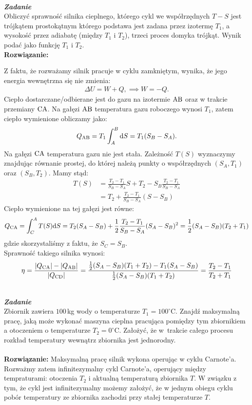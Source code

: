 \documentclass[11pt,a4paper]{article}
\newcounter{zadanie}\newcommand{\zadanie}[1][]{\addtocounter{zadanie}{1} ~\\  {\bf \emph{Zadanie \arabic{zadanie} #1 }} \\}
\begin{document}
\newpage
\zadanie
Obliczyć sprawność silnika cieplnego, którego cykl we współrzędnych $T-S$ jest trójkątem
prostokątnym którego podstawa jest zadana przez 
izotermę $T_1$, a wysokość przez adiabatę (między $T_1$ i $T_2$),  trzeci proces domyka trójkąt.
Wynik podać jako funkcję $T_1$ i $T_2$.
\\
\textbf{Rozwiązanie:}


Z faktu, że rozważamy silnik pracuje w cyklu zamkniętym, wynika, że jego energia wewnętrzna się nie zmienia:
\begin{align}
\Delta U = W + Q, \implies W = - Q.
\end{align}
Ciepło dostarczane/odbierane jest do gazu na izotermie $\rm{AB}$ oraz w trakcie przemiany $\rm{CA}$.
Na gałęzi $\rm {AB}$ temperatura gazu roboczego wynosi $T_1$, zatem ciepło wymienione obliczamy jako:
\begin{align}
Q_{\rm AB} = T_1 \int_A^B {\rm d}S = T_1 (S_B - S_A).
\end{align}
Na gałęzi $\rm CA$ temperatura gazu nie jest stała. Zależność $T(S)$ wyznaczymy znajdując równanie prostej, do której należą punkty o współrzędnych $(S_A, T_1 )$ oraz $(S_B, T_2)$. Mamy stąd:
\begin{align}
T(S) &= \frac{T_2 -T_1}{S_B-S_A} S +  T_2 - S_B \frac{T_2 -T_1}{S_B-S_A}\\
&= T_2 + \frac{T_2 -T_1}{S_B-S_A}  (S-S_B)
\end{align}
Ciepło wymienione na tej gałęzi jest równe:
\begin{align}
Q_{\rm {CA}}= \int_C^A T(S) {\rm d} S = T_2 (S_A- S_B) + \frac{1}{2}\frac{T_2- T_1}{S_B-S_A} (S_A-S_B)^2 = \frac{1}{2}(S_A-S_B)(T_2+T_1)
\end{align}
gdzie skorzystaliśmy z faktu, że $S_C=S_B$.\\
Sprawność takiego silnika wynosi:
\begin{align}
\eta = \frac{\lvert Q_{\rm CA} \rvert - \lvert Q_{\rm AB} \rvert }{\lvert Q_{\rm CD} \rvert} = \frac{\frac{1}{2}(S_A-S_B)(T_1+T_2)- T_1(S_A-S_B)}{\frac{1}{2}(S_A-S_B)(T_1+T_2)} = \frac{T_2-T_1}{T_2+T_1}
\end{align}

\newpage
\zadanie
Zbiornik zawiera $100\,$kg wody o temperaturze $T_1 = 100^\circ$C.
Znajdź maksymalną pracę, jaką może wykonać maszyna cieplna pracująca pomiędzy tym zbiornikiem a otoczeniem o temperaturze $T_2 = 0^\circ$C.
Założyć, że w~trakcie całego procesu rozkład temperatury wewnątrz zbiornika jest jednorodny.\\
\\
\textbf{Rozwiązanie:} Maksymalną pracę silnik wykona operując w cyklu Carnote'a. Rozważmy zatem infinitezymalny cykl Carnote'a, operujący między tempraturami: otoczenia $T_2$ i aktualną temperaturą zbiornika $T$. W związku z tym, że cykl jest infinitezymalny możemy założyć, że w jednym obiegu cyklu pobór temperatury ze zbiornika zachodzi przy stałej temperaturze $T$.
\end{document}
